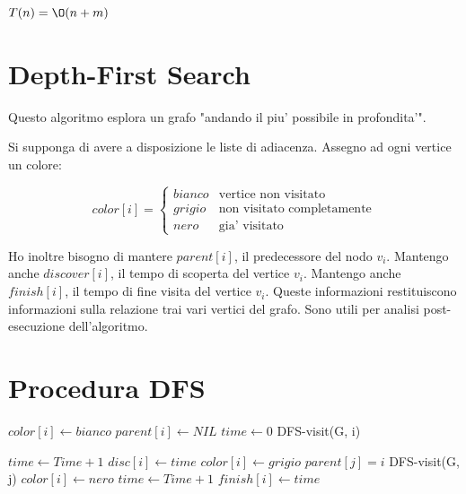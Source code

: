 $T(n) = \O(n + m)$

\section{Depth-First Search}

Questo algoritmo esplora un grafo "andando il piu' possibile in profondita'".

Si supponga di avere a disposizione le liste di adiacenza.
Assegno ad ogni vertice un colore:

\[
    color[i] = 
    \begin{cases}
        bianco & \text{vertice non visitato}\\
        grigio & \text{non visitato completamente}\\
        nero & \text{gia' visitato}
    \end{cases}
\]

Ho inoltre bisogno di mantere $parent[i]$, il predecessore del nodo $v_{i}$.
Mantengo anche $discover[i]$, il tempo di scoperta del vertice $v_{i}$.
Mantengo anche $finish[i]$, il tempo di fine visita del vertice $v_{i}$.
Queste informazioni restituiscono informazioni sulla relazione trai vari vertici del grafo. Sono utili per analisi post-esecuzione dell'algoritmo.

\newpage

\section{Procedura DFS}

\begin{algorithm}
    \begin{algorithmic}
                \State $color[i] \gets bianco$
                \State $parent[i] \gets NIL$
            \EndFor
            \State $time \gets 0$
                    \State DFS-visit(G, i)
                \EndIf
            \EndFor
         \EndProcedure
    \end{algorithmic}
\end{algorithm}

\begin{algorithm}
    \begin{algorithmic}
            \State $time \gets Time + 1$
            \State $disc[i] \gets time$
            \State $color[i] \gets grigio$
                    \State $parent[j] = i$
                    \State DFS-visit(G, j)
                \EndIf
            \EndFor
            \State $color[i] \gets nero$
            \State $time \gets Time + 1$
            \State $finish[i] \gets time$
        \EndProcedure
    \end{algorithmic}
\end{algorithm}

